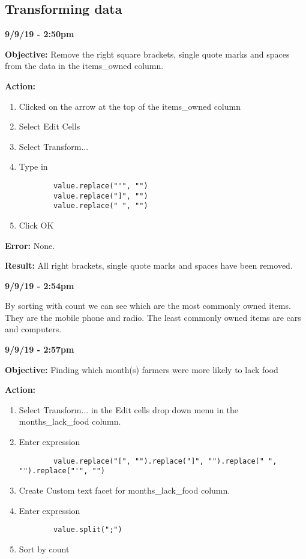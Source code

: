 \documentclass{article}
\begin{document}
\subsection{Transforming data}

\textbf{9/9/19 - 2:50pm}

\textbf{Objective:} Remove the right square brackets, single quote marks and spaces from the data in the items\_owned column.

\textbf{Action:}

\begin{enumerate}
    \item Clicked on the arrow at the top of the items\_owned column
    \item Select Edit Cells
    \item Select Transform...
    \item Type in \begin{verbatim}
        value.replace("'", "")
        value.replace("]", "")
        value.replace(" ", "")
    \end{verbatim}
    \item Click OK
\end{enumerate}

\textbf{Error:} None.

\textbf{Result:} All right brackets, single quote marks and spaces have been removed.

\textbf{9/9/19 - 2:54pm}

By sorting with count we can see which are the most commonly owned items. They are the mobile phone and radio. The least commonly owned items are cars and computers.

\textbf{9/9/19 - 2:57pm}

\textbf{Objective:} Finding which month(s) farmers were more likely to lack food

\textbf{Action:}

\begin{enumerate}
    \item Select Transform... in the Edit cells drop down menu in the months\_lack\_food column.
    \item Enter expression \begin{verbatim}
        value.replace("[", "").replace("]", "").replace(" ", "").replace("'", "")
    \end{verbatim}
    \item Create Custom text facet for months\_lack\_food column.
    \item Enter expression \begin{verbatim}
        value.split(";")
    \end{verbatim}
    \item Sort by count
\end{enumerate}
\end{document}
